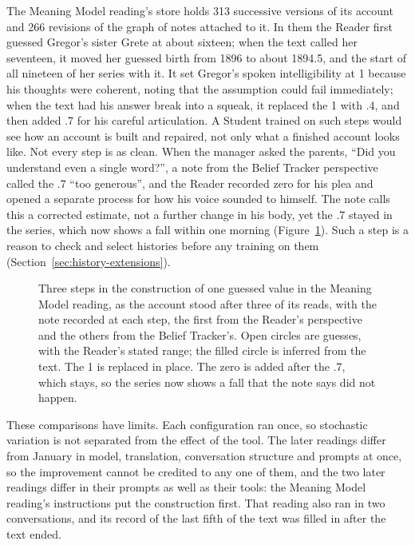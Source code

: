 \documentclass[11pt]{article}
\begin{document}
The Meaning Model reading's store holds 313 successive versions of its account
and 266 revisions of the graph of notes attached to it. In them the Reader first
guessed Gregor's sister Grete at about sixteen; when the text called her
seventeen, it moved her guessed birth from 1896 to about 1894.5, and the start of
all nineteen of her series with it. It set Gregor's spoken intelligibility at 1
because his thoughts were coherent, noting that the assumption could fail
immediately; when the text had his answer break into a squeak, it replaced the 1
with .4, and then added .7 for his careful articulation. A Student trained on
such steps would see how an account is built and repaired, not only what a
finished account looks like. Not every step is as clean. When the manager asked
the parents, ``Did you understand even a single word?'', a note from the Belief
Tracker perspective called the .7 ``too generous'', and the Reader recorded zero
for his plea and opened a separate process for how his voice sounded to himself.
The note calls this a corrected estimate, not a further change in his body, yet
the .7 stayed in the series, which now shows a fall within one morning
(Figure~\ref{fig:kafka-speech}). Such a step is a reason to check and select
histories before any training on them (Section~\ref{sec:history-extensions}).

\begin{figure}[htb]
    \centering
    
    \caption{Three steps in the construction of one guessed value in the Meaning Model reading, as the account stood after three of its reads, with the note recorded at each step, the first from the Reader's perspective and the others from the Belief Tracker's. Open circles are guesses, with the Reader's stated range; the filled circle is inferred from the text. The 1 is replaced in place. The zero is added after the .7, which stays, so the series now shows a fall that the note says did not happen.}
    \label{fig:kafka-speech}
\end{figure}

These comparisons have limits. Each configuration ran once, so stochastic
variation is not separated from the effect of the tool. The later readings differ from
January in model, translation, conversation structure and prompts at once, so
the improvement cannot be credited to any one of them, and the two later
readings differ in their prompts as well as their tools: the Meaning Model
reading's instructions put the construction first. That reading also ran in two
conversations, and its record of the last fifth of the text was filled in after the text ended.
\end{document}
